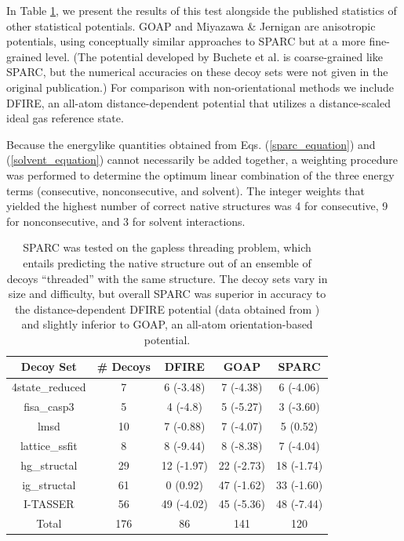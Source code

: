 \documentclass[11pt,titlepage]{article}
\begin{document}
In Table \ref{decoy_table}, we present the results of this test alongside the published statistics of other statistical potentials.
GOAP \cite{zhou2} and Miyazawa \& Jernigan \cite{miyazawa2} are anisotropic potentials, using conceptually similar approaches to SPARC but at a more fine-grained level.
(The potential developed by Buchete et al. \cite{buchete2003,buchete3} is coarse-grained like SPARC, but the numerical accuracies on these decoy sets were not given in the original publication.)
For comparison with non-orientational methods we include DFIRE, an all-atom distance-dependent potential that utilizes a distance-scaled ideal gas reference state.

Because the energylike quantities obtained from Eqs. (\ref{sparc_equation}) and (\ref{solvent_equation}) cannot necessarily be added together, a weighting procedure was performed to determine the optimum linear combination of the three energy terms (consecutive, nonconsecutive, and solvent).
The integer weights that yielded the highest number of correct native structures was 4 for consecutive, 9 for nonconsecutive, and 3 for solvent interactions.

\begin{table}
	\begin{center}
	\begin{tabular}{c c c c c}
		\toprule
		Decoy Set & \# Decoys & DFIRE & GOAP & SPARC \\
		\midrule
		4state\_reduced & 7 & 6 (-3.48) & 7 (-4.38) & 6 (-4.06)  \\
		fisa\_casp3 & 5 & 4 (-4.8)  & 5 (-5.27)  & 3 (-3.60)  \\
		lmsd & 10 & 7 (-0.88) & 7 (-4.07) & 5 (0.52)   \\
		lattice\_ssfit & 8 & 8 (-9.44) & 8 (-8.38) & 7 (-4.04)  \\
		hg\_structal & 29 & 12 (-1.97) & 22 (-2.73) & 18 (-1.74) \\
		ig\_structal & 61 & 0 (0.92)   & 47 (-1.62) & 33 (-1.60) \\
		I-TASSER & 56 & 49 (-4.02) & 45 (-5.36) & 48 (-7.44) \\
		\midrule
		Total & 176 & 86 & 141 & 120 \\
		\bottomrule
	\end{tabular}
	\end{center}
	\caption{SPARC was tested on the gapless threading problem, which entails predicting the native structure out of an ensemble of decoys ``threaded'' with the same structure. The decoy sets vary in size and difficulty, but overall SPARC was superior in accuracy to the distance-dependent DFIRE potential (data obtained from \cite{zhou2}) and slightly inferior to GOAP, an all-atom orientation-based potential.}
	\label{decoy_table}
\end{table}
\end{document}

